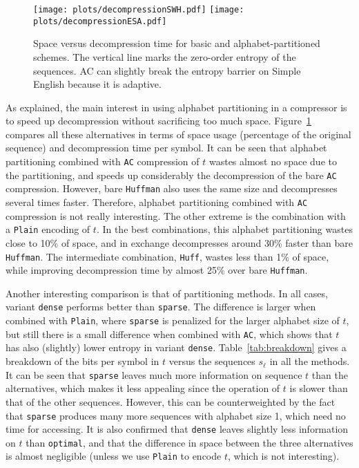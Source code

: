 \documentclass[11pt]{article}
\begin{document}
\begin{figure}[tb]
\centerline{\texttt{[image: plots/decompressionSWH.pdf]}
\texttt{[image: plots/decompressionESA.pdf]}}
\caption{Space versus decompression time for basic and alphabet-partitioned
schemes. The vertical line marks the zero-order entropy of the sequences. AC
can slightly break the entropy barrier on Simple English because it is 
adaptive.}
\label{fig:spacetime}
\end{figure}

As explained, the main interest in using alphabet partitioning in a 
compressor is to speed up decompression without sacrificing too much space.
Figure~\ref{fig:spacetime} compares all these alternatives in terms of space
usage (percentage of the original sequence) and decompression time per symbol. 
It can be seen that alphabet partitioning combined with {\tt AC} compression
of $t$ wastes almost no space due to the partitioning, and speeds up 
considerably the decompression of the bare {\tt AC} compression.
However, bare {\tt Huffman} also uses the same size and decompresses several
times faster. Therefore, alphabet partitioning combined with {\tt AC}
compression is not really interesting. The other extreme is the combination
with a {\tt Plain} encoding of $t$. In the best combinations, this alphabet
partitioning wastes close to 10\% of space, and in exchange decompresses
around 30\% faster than bare {\tt Huffman}. The intermediate combination,
{\tt Huff}, wastes less than 1\% of space, while improving decompression time
by almost 25\% over bare {\tt Huffman}.

Another interesting comparison is that of partitioning methods. In all cases,
variant {\tt dense} performs better than {\tt sparse}. The difference is larger
when combined with {\tt Plain}, where {\tt sparse} is penalized for the larger
alphabet size of $t$, but still there is a small difference when combined with
{\tt AC}, which shows that $t$ has also (slightly) lower entropy in variant 
{\tt dense}. 
Table~\ref{tab:breakdown} gives a breakdown of the bits per symbol in $t$
versus the sequences $s_\ell$ in all the methods. It can be seen that 
{\tt sparse} leaves much more information on sequence $t$ than the 
alternatives, which makes it less appealing since the operation of $t$ is 
slower than that of the other sequences. However, this can be counterweighted 
by the fact that {\tt sparse} produces many more sequences with alphabet size 
1, which need no time for accessing. It is also confirmed that {\tt dense} 
leaves slightly less information on $t$ than {\tt optimal}, and that the 
difference in space between the three alternatives is almost negligible 
(unless we use {\tt Plain} to encode $t$, which is not interesting).
\end{document}
